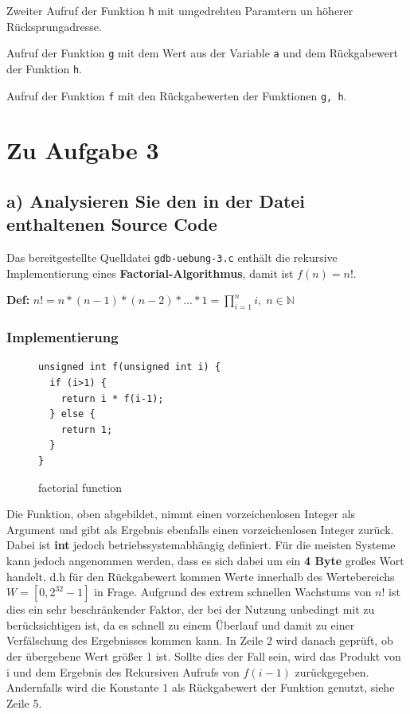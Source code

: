 \documentclass[12pt]{article}
\begin{document}
Zweiter Aufruf der Funktion \texttt{h} mit umgedrehten Paramtern un höherer Rücksprungadresse. 

Aufruf der Funktion \texttt{g} mit dem Wert aus der Variable \texttt{a} und dem Rückgabewert der Funktion \texttt{h}.

Aufruf der Funktion \texttt{f} mit den Rückgabewerten der Funktionen \texttt{g, h}.








\newpage
\section{Zu Aufgabe 3}
\subsection{a) Analysieren Sie den in der Datei enthaltenen Source Code}
Das bereitgestellte Quelldatei \texttt{gdb-uebung-3.c} enthält die rekursive Implementierung eines \textbf{Factorial-Algorithmus}, damit ist $f(n) = n! $.

\textbf{Def:} $ n! = n * (n-1) * (n-2) * ... * 1 = \prod_{i = 1}^{n} i ,\;  n \in \mathbb{N} $

\subsubsection{Implementierung}
\begin{figure}[h]
\begin{lstlisting}
unsigned int f(unsigned int i) {
  if (i>1) {
    return i * f(i-1);
  } else {
    return 1;
  }
}
\end{lstlisting}
\label{fig:factorial}
\caption{factorial function}
\end{figure}

Die Funktion, oben abgebildet, nimmt einen vorzeichenlosen Integer als Argument und gibt als Ergebnis ebenfalls einen vorzeichenlosen Integer zurück. Dabei ist \textbf{int} jedoch betriebssystemabhängig definiert. Für die meisten Systeme kann jedoch angenommen werden, dass es sich dabei um ein \textbf{4 Byte} großes Wort handelt, d.h für den Rückgabewert kommen Werte innerhalb des Wertebereichs $  W = [0,2^{32}-1] $ in Frage. Aufgrund des extrem schnellen Wachstums von $ n! $ ist dies ein sehr beschränkender Faktor, der bei der Nutzung unbedingt mit zu berücksichtigen ist, da es schnell zu einem Überlauf und damit zu einer Verfälschung des Ergebnisses kommen kann. In Zeile 2 wird danach geprüft, ob der übergebene Wert größer 1 ist. Sollte dies der Fall sein, wird das  Produkt von i und dem Ergebnis des Rekursiven Aufrufs von $ f(i-1) $ zurückgegeben. Andernfalls wird die Konstante 1 als Rückgabewert der Funktion genutzt, siehe Zeile 5.
\newpage
\end{document}
